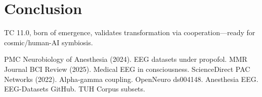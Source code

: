 \documentclass[12pt]{article}
\begin{document}
\section{Conclusion}
TC 11.0, born of emergence, validates transformation via cooperation—ready for cosmic/human-AI symbiosis.

\begin{thebibliography}{99}
 PMC Neurobiology of Anesthesia (2024). EEG datasets under propofol.
 MMR Journal BCI Review (2025). Medical EEG in consciousness.
 ScienceDirect PAC Networks (2022). Alpha-gamma coupling.
 OpenNeuro ds004148. Anesthesia EEG.
 EEG-Datasets GitHub. TUH Corpus subsets.
\end{thebibliography}
\end{document}
